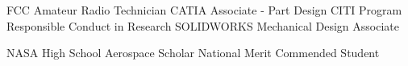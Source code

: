 \documentclass[letterpaper,ddMMMyyyy,nonstopmode]{simpleresumecv}
\newcommand{\tableWidth}{23.5em}
\begin{document}
\begin{Body}
\begin{tabular}[t]{p{11em} p{\tableWidth}}
		\end{tabular} %


		\Entry FCC Amateur Radio Technician
		\Entry CATIA Associate - Part Design
		\Entry CITI Program Responsible Conduct in Research
		\Entry SOLIDWORKS Mechanical Design Associate



		\Entry NASA High School Aerospace Scholar
		\Entry National Merit Commended Student
	\end{Body}
\end{document}
